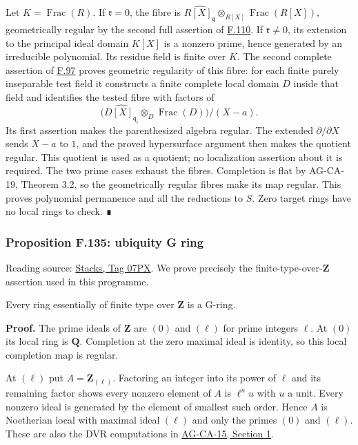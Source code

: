 \documentclass[11pt,a4paper,openany]{report}
\begin{document}
Let \(K=\operatorname{Frac}(R)\). If \(\mathfrak r=0\), the fibre is \(\widehat{R[X]_{\mathfrak q}}\otimes_{R[X]}\operatorname{Frac}(R[X])\), geometrically regular by the second full assertion of \hyperref[AG-RG-S05-more-algebra-lemma-helper-G-ring]{F.110}. If \(\mathfrak r\ne0\), its extension to the principal ideal domain \(K[X]\) is a nonzero prime, hence generated by an irreducible polynomial. Its residue field is finite over \(K\). The second complete assertion of \hyperref[AG-RG-S05-more-algebra-lemma-another-helper-G-ring]{F.97} proves geometric regularity of this fibre: for each finite purely inseparable test field it constructs a finite complete local domain \(D\) inside that field and identifies the tested fibre with factors of \[\big(\widehat{D[X]_{\mathfrak q_i}}\otimes_D\operatorname{Frac}(D)\big)/(X-a).\] Its first assertion makes the parenthesized algebra regular. The extended \(\partial/\partial X\) sends \(X-a\) to \(1\), and the proved hypersurface argument then makes the quotient regular. This quotient is used as a quotient; no localization assertion about it is required. The two prime cases exhaust the fibres. Completion is flat by AG-CA-19, Theorem 3.2, so the geometrically regular fibres make its map regular. This proves polynomial permanence and all the reductions to \(S\). Zero target rings have no local rings to check. ∎

\label{AG-RG-S05-more-algebra-proposition-ubiquity-G-ring}

\subsubsection{Proposition F.135: ubiquity G ring}\label{AG-RG-S05-proposition-f.135-ubiquity-g-ring}

Reading source: \href{https://stacks.math.columbia.edu/tag/07PX}{Stacks, Tag 07PX}. We prove precisely the finite-type-over-\(\mathbf Z\) assertion used in this programme.

Every ring essentially of finite type over \(\mathbf Z\) is a G-ring.

\textbf{Proof.} The prime ideals of \(\mathbf Z\) are \((0)\) and \((\ell)\) for prime integers \(\ell\). At \((0)\) its local ring is \(\mathbf Q\). Completion at the zero maximal ideal is identity, so this local completion map is regular.

At \((\ell)\) put \(A=\mathbf Z_{(\ell)}\). Factoring an integer into its power of \(\ell\) and its remaining factor shows every nonzero element of \(A\) is \(\ell^n u\) with \(u\) a unit. Every nonzero ideal is generated by the element of smallest such order. Hence \(A\) is Noetherian local with maximal ideal \((\ell)\) and only the primes \((0)\) and \((\ell)\). These are also the DVR computations in \href{https://github.com/KokunoYumeto/open-math-courses/blob/d02d0a3669f42579db037cd44de1d113fdd770a1/docs/courses/AG-CA/src/discrete-valuation-rings-normal-rings-and-serres-criterion.md}{AG-CA-15, Section 1}.
\end{document}
